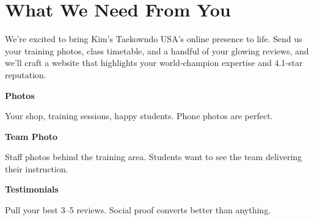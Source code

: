 \documentclass[11pt,letterpaper]{article}
\begin{document}
\vspace{0.2em}

\section*{What We Need From You}

We’re excited to bring Kim's Taekowndo USA’s online presence to life. Send us your training photos, class timetable, and a handful of your glowing reviews, and we’ll craft a website that highlights your world‑champion expertise and 4.1‑star reputation.

\vspace{0.12em}

\noindent\begin{minipage}[t]{0.48\textwidth}
\begin{tcolorbox}[colframe=accent-teal, boxrule=1pt, left=0.7em, right=0.7em, top=0.5em, bottom=0.5em, arc=4pt, boxsep=0pt]
{\bfseries\small\color{accent-teal}Photos}

\vspace{0.15em}

{\small Your shop, training sessions, happy students. Phone photos are perfect.}
\end{tcolorbox}

\vspace{0.1em}

\begin{tcolorbox}[colframe=accent-teal, boxrule=1pt, left=0.7em, right=0.7em, top=0.5em, bottom=0.5em, arc=4pt, boxsep=0pt]
{\bfseries\small\color{accent-teal}Team Photo}

\vspace{0.15em}

{\small Staff photos behind the training area. Students want to see the team delivering their instruction.}
\end{tcolorbox}

\vspace{0.1em}

\begin{tcolorbox}[colframe=accent-teal, boxrule=1pt, left=0.7em, right=0.7em, top=0.5em, bottom=0.5em, arc=4pt, boxsep=0pt]
{\bfseries\small\color{accent-teal}Testimonials}

\vspace{0.15em}

{\small Pull your best 3--5 reviews. Social proof converts better than anything.}
\end{tcolorbox}
\end{minipage}
\end{document}
